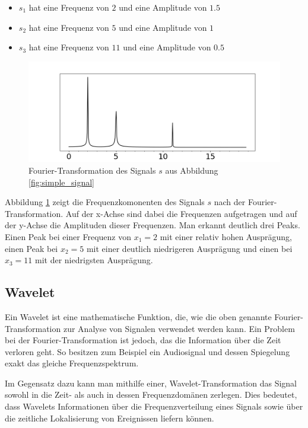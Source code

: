 \begin{itemize}
    \item \(s_1\) hat eine Frequenz von \(2\) und eine Amplitude von \(1.5\)
    \item \(s_2\) hat eine Frequenz von \(5\) und eine Amplitude von \(1\)
    \item \(s_3\) hat eine Frequenz von \(11\) und eine Amplitude von \(0.5\)
\end{itemize}

\begin{figure}[H]
    \centering
    \includegraphics[width=1\linewidth]{images/simple_fft.png}
    \caption[Fourier-Transformation des Signals \(s\)] {Fourier-Transformation des Signals \(s\) aus Abbildung \ref{fig:simple_signal}}
    \label{fig:simple_fft}
\end{figure}

Abbildung \ref{fig:simple_fft} zeigt die Frequenzkomonenten des Signals \(s\) nach der Fourier-Transformation. Auf der x-Achse sind dabei die Frequenzen aufgetragen und auf der y-Achse die Amplituden dieser Frequenzen.
Man erkannt deutlich drei Peaks.
Einen Peak bei einer Frequenz von \(x_1 = 2\) mit einer relativ hohen Ausprägung, einen Peak bei \(x_2 = 5\) mit einer deutlich niedrigeren Ausprägung und einen bei \(x_3 = 11\) mit der niedrigsten Ausprägung.

\subsection{Wavelet} \label{ss:wavelet}

Ein Wavelet ist eine mathematische Funktion, die, wie die oben genannte Fourier-Transformation zur Analyse von Signalen verwendet werden kann. Ein Problem bei der Fourier-Transformation ist jedoch, das die Information über die Zeit verloren geht. So besitzen zum Beispiel ein Audiosignal und dessen Spiegelung exakt das gleiche Frequenzspektrum. \cite{Lee1999}

Im Gegensatz dazu kann man mithilfe einer, Wavelet-Transformation das Signal sowohl in die Zeit- als auch in dessen Frequenzdomänen zerlegen. Dies bedeutet, dass Wavelets Informationen über die Frequenzverteilung eines Signals sowie über die zeitliche Lokalisierung von Ereignissen liefern können.

